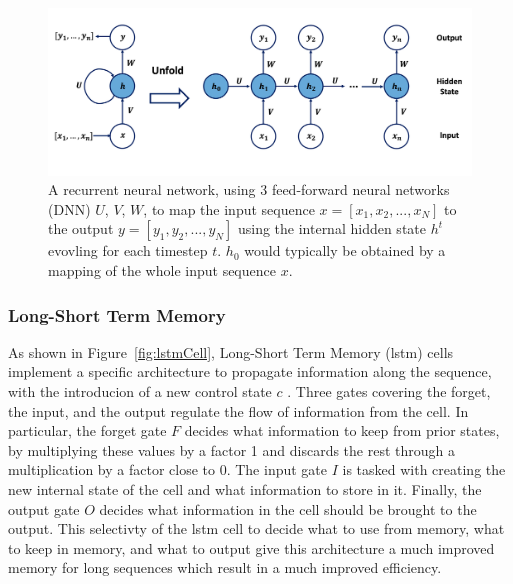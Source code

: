\begin{figure}[h!]
    \center
    \includegraphics[scale=0.5]{Images/ML/rnn.png}
    \caption{A recurrent neural network, using 3 feed-forward neural networks (DNN) $U$, $V$, $W$, to map the input sequence $x = [x_1, x_2, ..., x_N]$ to the output $y = [y_1, y_2, ..., y_N]$ using the internal hidden state $h^t$ evovling for each timestep $t$. $h_0$ would typically be obtained by a mapping of the whole input sequence $x$. } 
    \label{fig:rnnNet}
\end{figure}

\subsubsection{Long-Short Term Memory} 
As shown in Figure~\ref{fig:lstmCell}, Long-Short Term Memory (\gls{lstm}) cells implement a specific architecture to propagate information along the sequence, with the introducion of a new control state $c$ \cite{lstmPaper}. Three gates covering the forget, the input, and the output regulate the flow of information from the cell. In particular, the forget gate $F$ decides what information to keep from prior states, by multiplying these values by a factor 1 and discards the rest through a multiplication by a factor close to 0. The input gate $I$ is tasked with creating the new internal state of the cell and what information to store in it. Finally, the output gate $O$ decides what information in the cell should be brought to the output. This selectivty of the \gls{lstm} cell to decide what to use from memory, what to keep in memory, and what to output give this architecture a much improved memory for long sequences which result in a much improved efficiency. 

